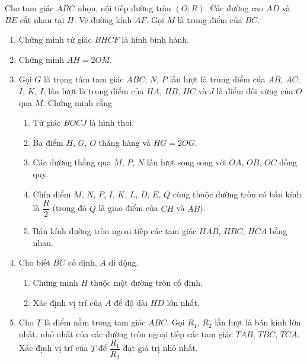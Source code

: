 \begin{bt}%
	Cho tam giác $ ABC $ nhọn, nội tiếp đường tròn $ (O;R) $. Các đường cao $ AD $ và $ BE $ cắt nhau tại $ H $. Vẽ đường kính $ AF $. Gọi $ M $ là trung điểm của $ BC $.
	\begin{enumerate}
		\item Chứng minh tứ giác $ BHCF $ là hình bình hành.
		\item Chứng minh $ AH=2OM $.
		\item Gọi $ G $ là trọng tâm tam giác $ ABC $; $ N $, $ P $ lần lượt là trung điểm của $ AB $, $ AC $; $ I $, $ K $, $ L $ lần lượt là trung điểm của $ HA $, $ HB $, $ HC $ và $ J $ là điểm đối xứng của $ O $ qua $ M $. Chứng minh rằng
		\begin{enumerate}[1)]
			\item Tứ giác $ BOCJ $ là hình thoi.
			\item Ba điểm $ H $, $ G $, $ O $ thẳng hàng và $ HG=2OG $.
			\item Các đường thẳng qua $ M $, $ P $, $ N $ lần lượt song song với $ OA $, $ OB $, $ OC $ đồng quy.
			\item Chín điểm $ M $, $ N $, $ P $, $ I $, $ K $, $ L $, $ D $, $ E $, $ Q $ cùng thuộc đường tròn có bán kính là $ \dfrac{R}{2} $ (trong đó $ Q $ là giao điểm của $ CH $ và $ AB $).
			\item Bán kính đường tròn ngoại tiếp các tam giác $ HAB $, $ HBC $, $ HCA $ bằng nhau.
		\end{enumerate}
		\item Cho biết $ BC $ cố định, $ A $ di động.
		\begin{enumerate}[1)]
			\item Chứng minh $ H $ thuộc một đường tròn cố định.
			\item Xác định vị trí của $ A $ để độ dài $ HD $ lớn nhất.
		\end{enumerate}
		\item Cho $ T $ là điểm nằm trong tam giác $ ABC $. Gọi $ R_{1} $, $ R_{2} $ lần lượt là bán kính lớn nhất, nhỏ nhất của các đường tròn ngoại tiếp các tam giác $ TAB $, $ TBC $, $ TCA $. Xác định vị trí của $ T $ để $ \dfrac{R_{1}}{R_{2}} $ đạt giá trị nhỏ nhất.
	\end{enumerate}
\end{bt}
